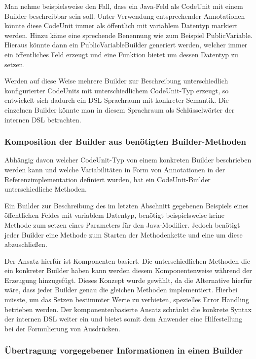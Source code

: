 \documentclass[12pt,oneside,a4paper,parskip]{scrbook}
\begin{document}
Man nehme beispielsweise den Fall, dass ein Java-Feld als CodeUnit mit einem Builder beschreibbar sein soll. Unter Verwendung entsprechender Annotationen könnte diese CodeUnit immer als öffentlich mit variablem Datentyp markiert werden. Hinzu käme eine sprechende Benennung wie zum Beispiel PublicVariable. Hieraus könnte dann ein PublicVariableBuilder generiert werden, welcher immer ein öffentliches Feld erzeugt und eine Funktion bietet um dessen Datentyp zu setzen.

Werden auf diese Weise mehrere Builder zur Beschreibung unterschiedlich konfigurierter CodeUnits mit unterschiedlichem CodeUnit-Typ erzeugt, so entwickelt sich dadurch ein DSL-Sprachraum mit konkreter Semantik. Die einzelnen Builder könnte man in diesem Sprachraum als Schlüsselwörter der internen DSL betrachten.

\subsubsection{Komposition der Builder aus benötigten Builder-Methoden}

Abhängig davon welcher CodeUnit-Typ von einem konkreten Builder beschrieben werden kann und welche Variabilitäten in Form von Annotationen in der Referenzimplementation definiert wurden, hat ein CodeUnit-Builder unterschiedliche Methoden. 

Ein Builder zur Beschreibung des im letzten Abschnitt gegebenen Beispiels eines öffentlichen Feldes mit variablem Datentyp, benötigt beispielsweise keine Methode zum setzen eines Parameters für den Java-Modifier. Jedoch benötigt jeder Builder eine Methode zum Starten der Methodenkette und eine um diese abzuschließen.

Der Ansatz hierfür ist Komponenten basiert. Die unterschiedlichen Methoden die ein konkreter Builder haben kann werden diesem Komponentenweise während der Erzeugung hinzugefügt. Dieses Konzept wurde gewählt, da die Alternative hierfür wäre, dass jeder Builder genau die gleichen Methoden implementiert. Hierbei müsste, um das Setzen bestimmter Werte zu verbieten, spezielles Error Handling betrieben werden. Der komponentenbasierte Ansatz schränkt die konkrete Syntax der internen DSL weiter ein und bietet somit dem Anwender eine Hilfestellung bei der Formulierung von Ausdrücken.

\subsubsection{Übertragung vorgegebener Informationen in einen Builder}
\end{document}

